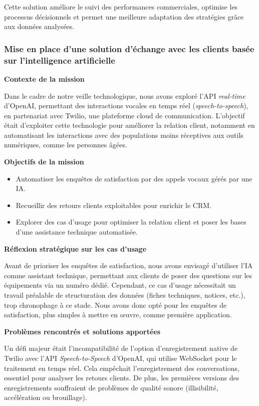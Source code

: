 Cette solution améliore le suivi des performances commerciales, optimise les processus décisionnels et permet une meilleure adaptation des stratégies grâce aux données analysées.

\subsubsection{Mise en place d’une solution d’échange avec les clients basée sur l’intelligence artificielle}

\textbf{Contexte de la mission}

Dans le cadre de notre veille technologique, nous avons exploré l’API \textit{real-time} d’OpenAI, permettant des interactions vocales en temps réel (\textit{speech-to-speech}), en partenariat avec Twilio, une plateforme cloud de communication. L’objectif était d’exploiter cette technologie pour améliorer la relation client, notamment en automatisant les interactions avec des populations moins réceptives aux outils numériques, comme les personnes âgées.

\textbf{Objectifs de la mission}

\begin{itemize}
    \item Automatiser les enquêtes de satisfaction par des appels vocaux gérés par une IA.
    \item Recueillir des retours clients exploitables pour enrichir le CRM.
    \item Explorer des cas d’usage pour optimiser la relation client et poser les bases d’une assistance technique automatisée.
\end{itemize}

\textbf{Réflexion stratégique sur les cas d’usage}

Avant de prioriser les enquêtes de satisfaction, nous avons envisagé d’utiliser l’IA comme assistant technique, permettant aux clients de poser des questions sur les équipements via un numéro dédié. Cependant, ce cas d’usage nécessitait un travail préalable de structuration des données (fiches techniques, notices, etc.), trop chronophage à ce stade. Nous avons donc opté pour les enquêtes de satisfaction, plus simples à mettre en œuvre, comme première application.

\textbf{Problèmes rencontrés et solutions apportées}

Un défi majeur était l’incompatibilité de l’option d’enregistrement native de Twilio avec l’API \textit{Speech-to-Speech} d’OpenAI, qui utilise WebSocket pour le traitement en temps réel. Cela empêchait l’enregistrement des conversations, essentiel pour analyser les retours clients. De plus, les premières versions des enregistrements souffraient de problèmes de qualité sonore (illisibilité, accélération ou brouillage).

